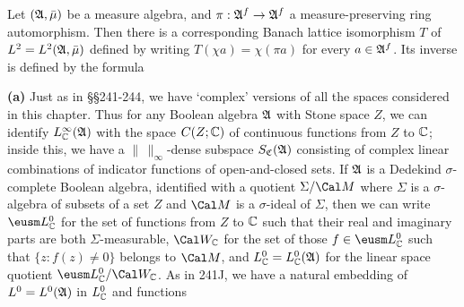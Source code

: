 
 Let $(\frak A,\bar\mu)$ be a measure algebra,
and $\pi:\frak A^f\to\frak A^f$ a measure-preserving ring automorphism.
Then there is a corresponding Banach lattice isomorphism $T$ of
$L^2=L^2(\frak A,\bar\mu)$ defined by writing $T(\chi a)=\chi(\pi a)$
for every $a\in\frak A^f$.   Its inverse is defined by the formula




{\bf (a)} Just as in \S\S241-244,
we have `complex' versions of all the spaces
considered in this chapter.   Thus for any Boolean algebra
$\frak A$ with Stone space $Z$, we can identify
$L^{\infty}_{\Bbb C}(\frak A)$ with the space $C(Z;\Bbb C)$ of continuous
functions from $Z$ to $\Bbb C$;  inside this, we have a
$\|\,\|_{\infty}$-dense subspace $S_{\frak C}(\frak A)$ consisting of
complex
linear combinations of indicator functions of open-and-closed sets.
If $\frak A$ is a Dedekind
$\sigma$-complete Boolean algebra, identified with a quotient
$\Sigma/\Cal M$ where $\Sigma$ is a $\sigma$-algebra of subsets of a set $Z$
and $\Cal M$ is a $\sigma$-ideal of $\Sigma$, then we can write
$\eusm L^0_{\Bbb C}$ for the set of functions from $Z$ to $\Bbb C$ such
that their real and imaginary parts are both $\Sigma$-measurable,
$\Cal W_{\Bbb C}$ for the set of those $f\in\eusm L^0_{\Bbb C}$ such that
$\{z:f(z)\ne 0\}$ belongs to $\Cal M$, and
$L^0_{\Bbb C}=L^0_{\Bbb C}(\frak A)$ for
the linear space quotient $\eusm L^0_{\Bbb C}/\Cal W_{\Bbb C}$.
As in 241J, we have
a natural embedding of $L^0=L^0(\frak A)$ in
$L^0_{\Bbb C}$ and functions

